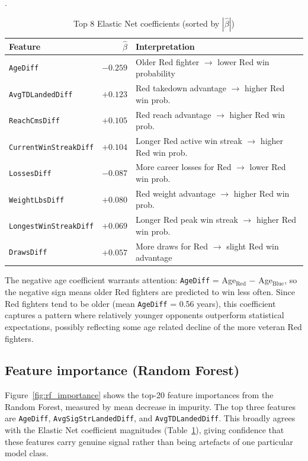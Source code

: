 \documentclass{article}
\begin{document}
\begin{table}[H]
\centering
\caption{Top 8 Elastic Net coefficients (sorted by $|\hat{\beta}|$)}.
\label{tab:coefs}
\begin{tabular}{lrl}
\toprule
Feature & $\hat{\beta}$ & Interpretation \\
\midrule
\texttt{AgeDiff}              & $-0.259$ & Older Red fighter $\rightarrow$ lower Red win probability \\
\texttt{AvgTDLandedDiff}      & $+0.123$ & Red takedown advantage $\rightarrow$ higher Red win prob. \\
\texttt{ReachCmsDiff}         & $+0.105$ & Red reach advantage $\rightarrow$ higher Red win prob. \\
\texttt{CurrentWinStreakDiff} & $+0.104$ & Longer Red active win streak $\rightarrow$ higher Red win prob. \\
\texttt{LossesDiff}           & $-0.087$ & More career losses for Red $\rightarrow$ lower Red win prob. \\
\texttt{WeightLbsDiff}        & $+0.080$ & Red weight advantage $\rightarrow$ higher Red win prob. \\
\texttt{LongestWinStreakDiff} & $+0.069$ & Longer Red peak win streak $\rightarrow$ higher Red win prob. \\
\texttt{DrawsDiff}            & $+0.057$ & More draws for Red $\rightarrow$ slight Red win advantage \\
\bottomrule
\end{tabular}
\end{table}

The negative age coefficient warrants attention: \texttt{AgeDiff} = Age$_\text{Red}$ $-$ Age$_\text{Blue}$, so the negative sign means older Red fighters are predicted to win less often.
Since Red fighters tend to be older (mean \texttt{AgeDiff} = 0.56 years), this
coefficient captures a pattern where relatively younger opponents outperform
statistical expectations, possibly reflecting some age related decline of
the more veteran Red fighters.

\subsection{Feature importance (Random Forest)}

Figure~\ref{fig:rf_importance} shows the top-20 feature importances from the
Random Forest, measured by mean decrease in impurity.
The top three features are \texttt{AgeDiff}, \texttt{AvgSigStrLandedDiff},
and \texttt{AvgTDLandedDiff}.
This broadly agrees with the Elastic Net coefficient magnitudes
(Table~\ref{tab:coefs}), giving confidence that these features carry genuine
signal rather than being artefacts of one particular model class.
\end{document}
